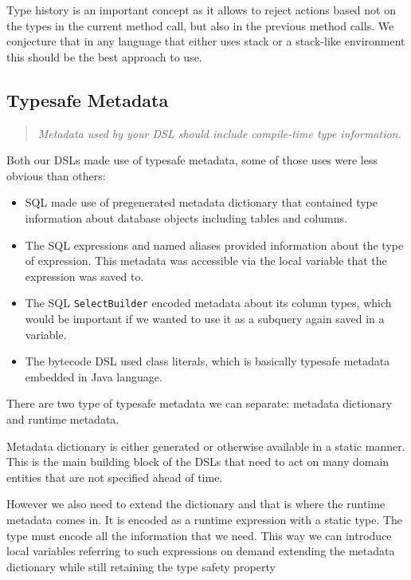\documentclass{sig-alternate}
\begin{document}
Type history is an important concept as it allows to reject actions based not on the types in the current method call, but also in the previous method calls. We conjecture that in any language that either uses stack or a stack-like environment this should be the best approach to use.

\subsection{Typesafe Metadata}

\begin{quote}
\emph{Metadata used by your DSL should include compile-time type information.}
\end{quote}

Both our DSLs made use of typesafe metadata, some of those uses were less obvious than others:
\begin{itemize}
\item SQL made use of pregenerated metadata dictionary that contained type information about database objects including tables and columns.
\item The SQL expressions and named aliases provided information about the type of expression. This metadata was accessible via the local variable that the expression was saved to.
\item The SQL \verb!SelectBuilder! encoded metadata about its column types, which would be important if we wanted to use it as a subquery again saved in a variable.
\item The bytecode DSL used class literals, which is basically typesafe metadata embedded in Java language.
\end{itemize}

There are two type of typesafe metadata we can separate: metadata dictionary and runtime metadata. 

Metadata dictionary is either generated or otherwise available in a static manner. This is the main building block of the DSLs that need to act on many domain entities that are not specified ahead of time. 

However we also need to extend the dictionary and that is where the runtime metadata comes in. It is encoded as a runtime expression with a static type. The type must encode all the information that we need. This way we can introduce local variables referring to such expressions on demand extending the metadata dictionary while still retaining the type safety property
\end{document}
